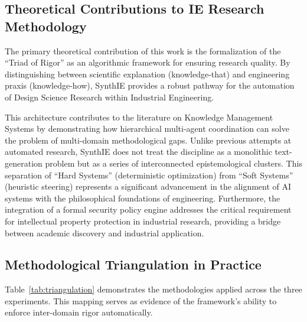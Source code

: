 \documentclass[12pt,a4paper]{article}
\begin{document}
\subsection{Theoretical Contributions to IE Research Methodology}

The primary theoretical contribution of this work is the formalization of the ``Triad of Rigor'' as an algorithmic framework for ensuring research quality. By distinguishing between scientific explanation (knowledge-that) and engineering praxis (knowledge-how), SynthIE provides a robust pathway for the automation of Design Science Research within Industrial Engineering.

This architecture contributes to the literature on Knowledge Management Systems by demonstrating how hierarchical multi-agent coordination can solve the problem of multi-domain methodological gaps. Unlike previous attempts at automated research, SynthIE does not treat the discipline as a monolithic text-generation problem but as a series of interconnected epistemological clusters. This separation of ``Hard Systems'' (deterministic optimization) from ``Soft Systems'' (heuristic steering) represents a significant advancement in the alignment of AI systems with the philosophical foundations of engineering. Furthermore, the integration of a formal security policy engine addresses the critical requirement for intellectual property protection in industrial research, providing a bridge between academic discovery and industrial application.

\subsection{Methodological Triangulation in Practice}

Table~\ref{tab:triangulation} demonstrates the methodologies applied across the three experiments. This mapping serves as evidence of the framework's ability to enforce inter-domain rigor automatically.
\end{document}
